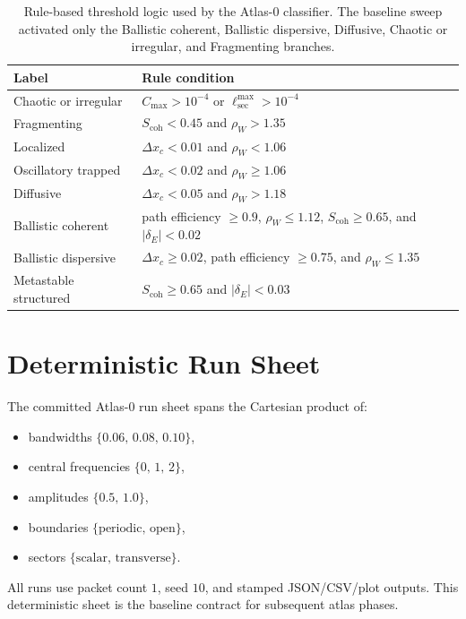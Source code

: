 \documentclass[11pt]{article}
\begin{document}
\begin{table}[h]
\centering
\begin{tabular}{lp{}}
\hline
Label & Rule condition \\
\hline
Chaotic or irregular & $C_{\max}>10^{-4}$ or $\ell_{\mathrm{sec}}^{\max}>10^{-4}$ \\
Fragmenting & $S_{\mathrm{coh}}<0.45$ and $\rho_W>1.35$ \\
Localized & $\Delta x_c<0.01$ and $\rho_W<1.06$ \\
Oscillatory trapped & $\Delta x_c<0.02$ and $\rho_W\geq 1.06$ \\
Diffusive & $\Delta x_c<0.05$ and $\rho_W>1.18$ \\
Ballistic coherent & path efficiency $\geq 0.9$, $\rho_W \leq 1.12$, $S_{\mathrm{coh}}\geq 0.65$, and $|\delta_E|<0.02$ \\
Ballistic dispersive & $\Delta x_c\geq 0.02$, path efficiency $\geq 0.75$, and $\rho_W \leq 1.35$ \\
Metastable structured & $S_{\mathrm{coh}}\geq 0.65$ and $|\delta_E|<0.03$ \\
\hline
\end{tabular}
\caption{Rule-based threshold logic used by the Atlas-0 classifier. The baseline sweep activated only the Ballistic coherent, Ballistic dispersive, Diffusive, Chaotic or irregular, and Fragmenting branches.}
\label{tab:thresholds}
\end{table}

\section{Deterministic Run Sheet}
The committed Atlas-0 run sheet spans the Cartesian product of:
\begin{itemize}
\item bandwidths $\{0.06,\,0.08,\,0.10\}$,
\item central frequencies $\{0,\,1,\,2\}$,
\item amplitudes $\{0.5,\,1.0\}$,
\item boundaries $\{\text{periodic},\,\text{open}\}$,
\item sectors $\{\text{scalar},\,\text{transverse}\}$.
\end{itemize}
All runs use packet count $1$, seed $10$, and stamped JSON/CSV/plot outputs. This deterministic sheet is the baseline contract for subsequent atlas phases.
\end{document}
